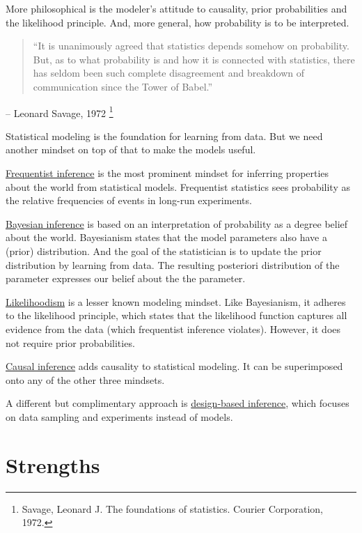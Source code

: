 \documentclass[
  10pt,
]{scrbook}
\begin{document}
More philosophical is the modeler's attitude to causality, prior probabilities and the likelihood principle.
And, more general, how probability is to be interpreted.

\begin{quote}
``It is unanimously agreed that statistics depends somehow on probability. But, as to what probability is and how it is connected with statistics, there has seldom been such complete disagreement and breakdown of communication since the Tower of Babel.''
\end{quote}

-- Leonard Savage, 1972 \footnote{Savage, Leonard J. The foundations of statistics. Courier Corporation, 1972.}

Statistical modeling is the foundation for learning from data.
But we need another mindset on top of that to make the models useful.

\protect\hyperlink{frequentism}{Frequentist inference} is the most prominent mindset for inferring properties about the world from statistical models.
Frequentist statistics sees probability as the relative frequencies of events in long-run experiments.

\protect\hyperlink{bayesian}{Bayesian inference} is based on an interpretation of probability as a degree belief about the world.
Bayesianism states that the model parameters also have a (prior) distribution.
And the goal of the statistician is to update the prior distribution by learning from data.
The resulting posteriori distribution of the parameter expresses our belief about the the parameter.

\protect\hyperlink{likelihoodism}{Likelihoodism} is a lesser known modeling mindset. Like Bayesianism, it adheres to the likelihood principle, which states that the likelihood function captures all evidence from the data (which frequentist inference violates).
However, it does not require prior probabilities.

\protect\hyperlink{causality}{Causal inference} adds causality to statistical modeling. It can be superimposed onto any of the other three mindsets.

A different but complimentary approach is \protect\hyperlink{design}{design-based inference}, which focuses on data sampling and experiments instead of models.

\hypertarget{strengths}{%
\section{Strengths}\label{strengths}}
\end{document}

